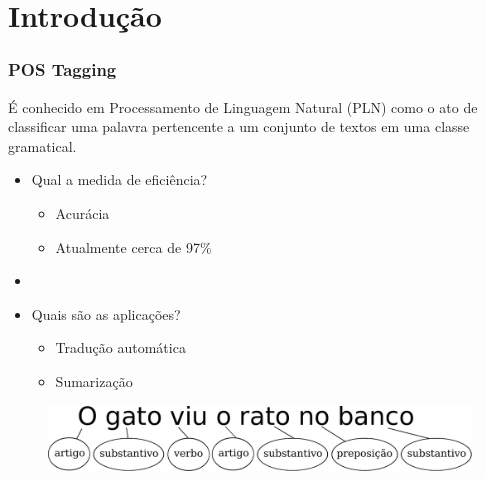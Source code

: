 \documentclass[10pt]{beamer}
\begin{document}
\section{Introdução}

\begin{frame}[fragile]
  \frametitle{POS Tagging}

  É conhecido em Processamento de Linguagem Natural (PLN) como o ato de classificar uma palavra pertencente a um conjunto de textos em uma classe gramatical.

    \begin{itemize}
      \item Qual a medida de eficiência? 
      \begin{itemize}
        \item[-] Acurácia
        \item[-] Atualmente cerca de 97\%
      \end{itemize}

      \item[\ ] \ 

      \item Quais são as aplicações?
      \begin{itemize}
        \item[-] Tradução automática
        \item[-] Sumarização
      \end{itemize}

    \end{itemize}

  
    \begin{figure}[htb]
    \begin{center}
        \includegraphics[scale=0.5]{img/exemploclassificacao.pdf}
    \end{center}
  \end{figure}

\end{frame}
\end{document}
